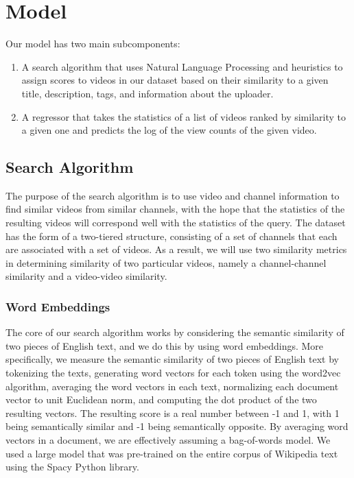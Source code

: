 \documentclass[12pt]{article}
\theoremstyle{definition}
\theoremstyle{remark}
\begin{document}
\section{Model}
Our model has two main subcomponents:
\begin{enumerate}
  \item A search algorithm that uses Natural
Language Processing and heuristics to assign scores to videos in our dataset
based on their similarity to a given title, description, tags, and information
about the uploader.
\item A regressor that takes the statistics of a list of videos ranked by
  similarity to a given one and predicts the log of the view counts of the given video.
\end{enumerate}
\subsection{Search Algorithm}
The purpose of the search algorithm is to use video and channel information
to find similar videos from similar channels, with the hope that the statistics
of the resulting videos will correspond well with the statistics of the query.
The dataset has the form of a two-tiered structure, consisting of a set of
channels that each are associated with a set of videos. As a result, we will use
two similarity metrics in determining similarity of two particular videos,
namely a channel-channel similarity and a video-video similarity.

\subsubsection{Word Embeddings}
The core of our search algorithm works by considering the semantic similarity of
two pieces of English text, and we do this by using word embeddings. More
specifically, we measure the semantic similarity of two pieces of English text
by tokenizing the texts, generating word vectors for each token using the
word2vec algorithm, averaging the word vectors in each text, normalizing each
document vector to unit Euclidean norm, and computing the dot product of the two
resulting vectors. The resulting score is a real number between -1 and 1, with 1
being semantically similar and -1 being semantically opposite. By averaging word
vectors in a document, we are effectively assuming a bag-of-words model. We used
a large model that was pre-trained on the entire corpus of Wikipedia text using
the Spacy Python library.
\end{document}

